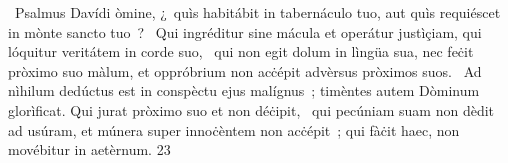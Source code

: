 {~Psalmus Davídi}
{%
òmine, ¿~quìs habitábit in tabernáculo tuo, aut quìs requiéscet in mònte sancto tuo~?
~Qui ingréditur sine mácula et operátur justìçiam, qui lóquitur veritátem in corde suo,
~qui non egit dolum in lìngüa sua, nec feċit pròximo suo màlum, et oppróbrium non acċépit advèrsus pròximos suos.
~Ad nìhilum dedúctus est in conspèctu ejus malígnus~; timèntes autem Dòminum glorìficat. Qui jurat pròximo suo et non déċipit,
~qui pecúniam suam non dèdit ad usúram, et múnera super innoċèntem non acċépit~; qui fàċit haec, non movébitur in aetèrnum.}
{2}{3}
